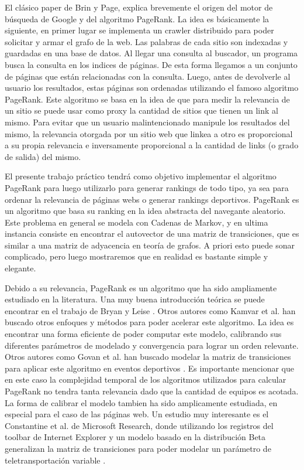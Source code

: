 El clásico paper de Brin y Page,  \cite{Brin1998} explica brevemente el origen del motor de búsqueda de Google y del algoritmo PageRank. La idea es básicamente la siguiente, en primer lugar se implementa un crawler distribuido para poder solicitar y armar el grafo de la web. Las palabras de cada sitio son indexadas y guardadas en una base de datos. Al llegar una consulta al buscador, un programa busca la consulta en los indices de páginas. De esta forma llegamos a un conjunto de páginas que están relacionadas con la consulta. Luego, antes de devolverle al usuario los resultados, estas páginas son ordenadas utilizando el famoso algoritmo PageRank. Este algoritmo se basa en la idea de que para medir la relevancia de un sitio se puede usar como proxy la cantidad de sitios que tienen un link al mismo. Para evitar que un usuario malintencionado manipule los resultados del mismo, la relevancia otorgada por un sitio web que linkea a otro es proporcional a su propia relevancia e inversamente proporcional a la cantidad de links (o grado de salida) del mismo.

El presente trabajo práctico tendrá como objetivo implementar el algoritmo PageRank para luego utilizarlo para generar rankings de todo tipo, ya sea para ordenar la relevancia de páginas webs o generar rankings deportivos. PageRank es un algoritmo que basa su ranking en la idea abstracta del navegante aleatorio. Este problema en general se modela con Cadenas de Markov, y en ultima instancia consiste en encontrar el autovector de una matriz de transiciones, que es similar a una matriz de adyacencia en teoría de grafos. A priori esto puede sonar complicado, pero luego mostraremos que en realidad es bastante simple y elegante.

Debido a su relevancia, PageRank es un algoritmo que ha sido ampliamente estudiado en la literatura. Una muy buena introducción teórica se puede encontrar en el trabajo de Bryan y Leise \cite{Bryan2006}. Otros autores como Kamvar et al. \cite{Kamvar2003} han buscado otros enfoques y métodos para poder acelerar este algoritmo. La idea es encontrar una forma eficiente de poder computar este modelo, calibrando sus diferentes parámetros de modelado y convergencia para lograr un orden relevante. Otros autores como Govan et al. han buscado modelar la matriz de transiciones para aplicar este algoritmo en eventos deportivos \cite{Govan2008}. Es importante mencionar que en este caso la complejidad temporal de los algoritmos utilizados para calcular PageRank no tendra tanta relevancia dado que la cantidad de equipos es acotada. La forma de calibrar el modelo tambien ha sido amplicamente estudiada, en especial para el caso de las páginas web. Un estudio muy interesante es el Constantine et al. de Microsoft Research, donde utilizando los registros del toolbar de Internet Explorer y un modelo basado en la distribución Beta generalizan la matriz de transiciones para poder modelar un parámetro de teletransportación variable \cite{TeleParam}.


